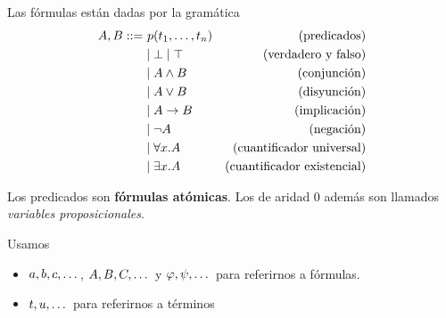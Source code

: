 \begin{definition}[Fórmulas]
    Las fórmulas están dadas por la gramática
    \begin{align*}
        A, B ::=
         & \ p(t_1, \dots, t_n) & (\text{predicados})                \\
         & \mid \bot \mid \top             & \text{(verdadero y falso)}         \\
         & \mid A \wedge B        & \text{(conjunción)}                \\
         & \mid A \vee B         & \text{(disyunción)}                \\
         & \mid A \to B        & \text{(implicación)}               \\
         & \mid \neg A                 & \text{(negación)}                  \\
         & \mid \forall x . A        & \text{(cuantificador universal)}   \\
         & \mid \exists x . A        & \text{(cuantificador existencial)}
    \end{align*}

    Los predicados son \textbf{fórmulas atómicas}. Los de aridad 0 además son llamados \textit{variables proposicionales}.
\end{definition}

\begin{notation*}
    Usamos
    \begin{itemize}
        \item $a, b, c, \dots$, $A, B, C, \dots$ y $\varphi, \psi, \dots$ para referirnos a fórmulas.
        \item $t, u, \dots$ para referirnos a términos
    \end{itemize}
\end{notation*}

